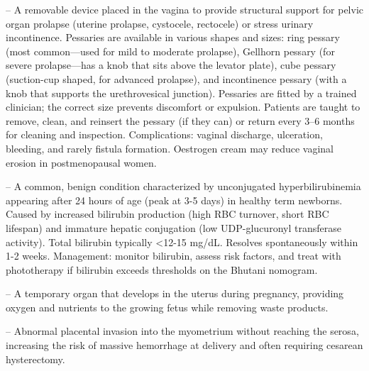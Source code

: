 -- A removable device placed in the vagina to provide structural support for pelvic organ prolapse (uterine prolapse, cystocele, rectocele) or stress urinary incontinence. Pessaries are available in various shapes and sizes: ring pessary (most common—used for mild to moderate prolapse), Gellhorn pessary (for severe prolapse—has a knob that sits above the levator plate), cube pessary (suction-cup shaped, for advanced prolapse), and incontinence pessary (with a knob that supports the urethrovesical junction). Pessaries are fitted by a trained clinician; the correct size prevents discomfort or expulsion. Patients are taught to remove, clean, and reinsert the pessary (if they can) or return every 3--6 months for cleaning and inspection. Complications: vaginal discharge, ulceration, bleeding, and rarely fistula formation. Oestrogen cream may reduce vaginal erosion in postmenopausal women.

-- A common, benign condition characterized by unconjugated hyperbilirubinemia appearing after 24 hours of age (peak at 3-5 days) in healthy term newborns. Caused by increased bilirubin production (high RBC turnover, short RBC lifespan) and immature hepatic conjugation (low UDP-glucuronyl transferase activity). Total bilirubin typically <12-15 mg/dL. Resolves spontaneously within 1-2 weeks. Management: monitor bilirubin, assess risk factors, and treat with phototherapy if bilirubin exceeds thresholds on the Bhutani nomogram.

-- A temporary organ that develops in the uterus during pregnancy, providing oxygen and nutrients to the growing fetus while removing waste products.

-- Abnormal placental invasion into the myometrium without reaching the serosa, increasing the risk of massive hemorrhage at delivery and often requiring cesarean hysterectomy.

